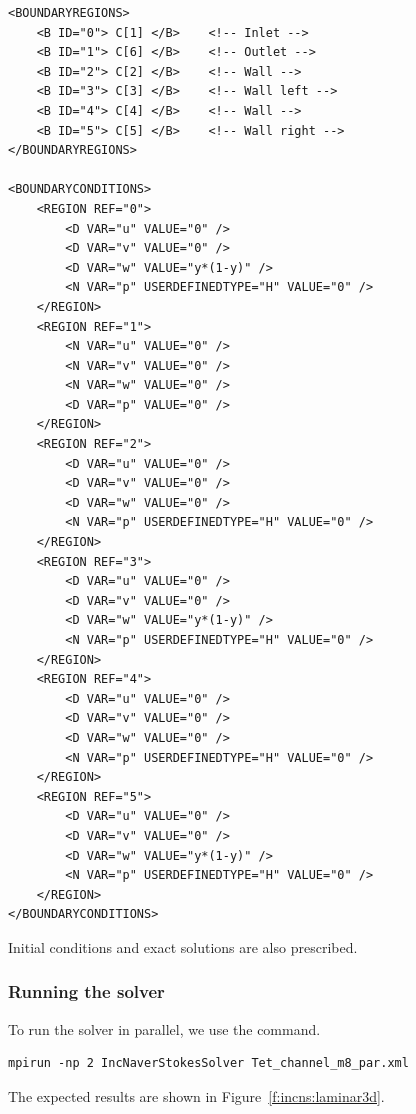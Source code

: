 \begin{lstlisting}[style=XMLStyle]
<BOUNDARYREGIONS>
    <B ID="0"> C[1] </B>    <!-- Inlet -->
    <B ID="1"> C[6] </B>    <!-- Outlet -->
    <B ID="2"> C[2] </B>    <!-- Wall -->
    <B ID="3"> C[3] </B>    <!-- Wall left -->
    <B ID="4"> C[4] </B>    <!-- Wall -->
    <B ID="5"> C[5] </B>    <!-- Wall right -->
</BOUNDARYREGIONS>

<BOUNDARYCONDITIONS>
    <REGION REF="0">
        <D VAR="u" VALUE="0" />
        <D VAR="v" VALUE="0" />
        <D VAR="w" VALUE="y*(1-y)" />
        <N VAR="p" USERDEFINEDTYPE="H" VALUE="0" />
    </REGION>
    <REGION REF="1">
        <N VAR="u" VALUE="0" />
        <N VAR="v" VALUE="0" />
        <N VAR="w" VALUE="0" />
        <D VAR="p" VALUE="0" />
    </REGION>
    <REGION REF="2">
        <D VAR="u" VALUE="0" />
        <D VAR="v" VALUE="0" />
        <D VAR="w" VALUE="0" />
        <N VAR="p" USERDEFINEDTYPE="H" VALUE="0" />
    </REGION>
    <REGION REF="3">
        <D VAR="u" VALUE="0" />
        <D VAR="v" VALUE="0" />
        <D VAR="w" VALUE="y*(1-y)" />
        <N VAR="p" USERDEFINEDTYPE="H" VALUE="0" />
    </REGION>
    <REGION REF="4">
        <D VAR="u" VALUE="0" />
        <D VAR="v" VALUE="0" />
        <D VAR="w" VALUE="0" />
        <N VAR="p" USERDEFINEDTYPE="H" VALUE="0" />
    </REGION>
    <REGION REF="5">
        <D VAR="u" VALUE="0" />
        <D VAR="v" VALUE="0" />
        <D VAR="w" VALUE="y*(1-y)" />
        <N VAR="p" USERDEFINEDTYPE="H" VALUE="0" />
    </REGION>
</BOUNDARYCONDITIONS>
\end{lstlisting}

Initial conditions and exact solutions are also prescribed.

\subsubsection{Running the solver}
To run the solver in parallel, we use the  command.
\begin{lstlisting}[style=BashInputStyle]
mpirun -np 2 IncNaverStokesSolver Tet_channel_m8_par.xml
\end{lstlisting}

The expected results are shown in Figure~\ref{f:incns:laminar3d}.

